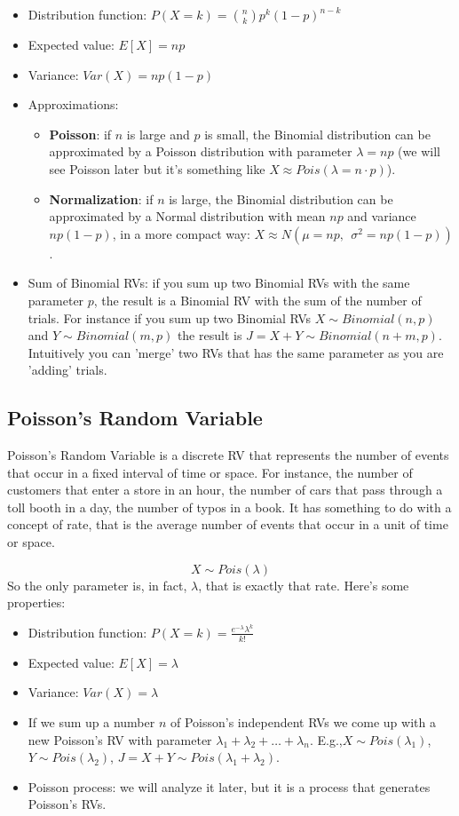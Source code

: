 \documentclass[a4paper]{article}
\begin{document}
\begin{itemize}
    \item Distribution function: \( P(X = k) = \binom{n}{k}p^k(1 - p)^{n - k} \)
    \item Expected value: \( E[X] = np \)
    \item Variance: \( Var(X) = np(1 - p) \)
    \item Approximations: \begin{itemize} 
        \item   \textbf{Poisson}: if $n$ is large and $p$ is small, the Binomial distribution can be approximated by a Poisson distribution with parameter $\lambda = np$ (we will see Poisson later but it's something like $X \approx Pois(\lambda = n\cdot p)$).
        \item \textbf{Normalization}: if $n$ is large, the Binomial distribution can be approximated by a Normal distribution with mean $np$ and variance $np(1 - p)$, in a more compact way: $X \approx N(\mu =np,\ \ \sigma^2= np(1-p))$.
    \end{itemize}
    \item Sum of Binomial RVs: if you sum up two Binomial RVs with the same parameter $p$, the result is a Binomial RV with the sum of the number of trials. For instance if you sum up two Binomial RVs $X \sim Binomial(n, p)$ and $Y \sim Binomial(m, p)$ the result is $J = X + Y \sim Binomial(n + m, p)$.\\
    Intuitively you can 'merge' two RVs that has the same parameter as you are 'adding' trials.
\end{itemize}

\subsection{Poisson's Random Variable}
Poisson's Random Variable is a discrete RV that represents the number of events that occur in a fixed interval of time or space.
For instance, the number of customers that enter a store in an hour, the number of cars that pass through a toll booth in a day, the number of typos in a book.
It has something to do with a concept of rate, that is the average number of events that occur in a unit of time or space.

$$X \sim Pois(\lambda)$$
So the only parameter is, in fact, $\lambda$, that is exactly that rate. Here's some properties:
\begin{itemize}
    \item Distribution function: \( P(X = k) = \frac{e^{-\lambda}\lambda^k}{k!} \)
    \item Expected value: \( E[X] = \lambda \)
    \item Variance: \( Var(X) = \lambda \)
    \item If we sum up a number $n$ of Poisson's independent RVs we come up with a new Poisson's RV with parameter $\lambda_1 + \lambda_2 + \ldots + \lambda_n$. E.g.,$X \sim Pois(\lambda_1)$, $Y \sim Pois(\lambda_2)$, $J = X + Y \sim Pois(\lambda_1 + \lambda_2)$.
    \item Poisson process: we will analyze it later, but it is a process that generates Poisson's RVs.
\end{itemize}
\end{document}
